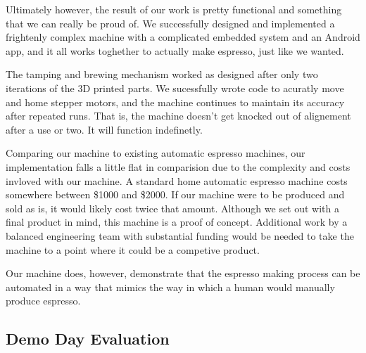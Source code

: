 \documentclass[conference]{IEEEtran}
\begin{document}
Ultimately however, the result of our work is pretty functional and something
that we can really be proud of. We successfully designed and implemented a
frightenly complex machine with a complicated embedded system and an Android app, and it
all works toghether to actually make espresso, just like we wanted.

The tamping and brewing mechanism worked as designed after only two iterations
of the 3D printed parts. We sucessfully wrote code to acuratly move and home
stepper motors, and the machine continues to maintain its accuracy after
repeated runs. That is, the machine doesn't get knocked out of alignement after
a use or two. It will function indefinetly.

Comparing our machine to existing automatic espresso machines, our
implementation falls a little flat in comparision due to the complexity and
costs invloved with our machine. A standard home automatic espresso machine
costs somewhere between \$1000 and \$2000. If our machine were to be produced
and sold as is, it would likely cost twice that amount. Although we set out with a
final product in mind, this machine is a proof of concept. Additional work by a
balanced engineering team with substantial funding would be needed to take the
machine to a point where it could be a competive product. 

Our machine does, however, demonstrate that the espresso making process can be
automated in a way that mimics the way in which a human would manually produce
espresso.
\subsection{Demo Day Evaluation}
% 
% 
\end{document}
